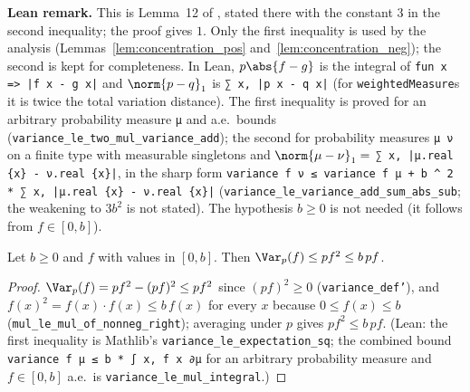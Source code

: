 \textbf{Lean remark.} This is Lemma~12 of \cite{menard2021fast}, stated there with the constant
$3$ in the second inequality; the proof gives $1$. Only the first inequality is used by the
analysis (Lemmas~\ref{lem:concentration_pos} and~\ref{lem:concentration_neg}); the second is
kept for completeness. In Lean, $p\abs{f - g}$ is the integral of \texttt{fun x => |f x - g x|}
and $\norm{p - q}_1$ is \texttt{∑ x, |p x - q x|} (for \texttt{weightedMeasure}s it is twice the
total variation distance). The first inequality is proved for an arbitrary probability measure
\texttt{μ} and a.e.\ bounds (\texttt{variance\_le\_two\_mul\_variance\_add}); the second for
probability measures \texttt{μ ν} on a finite type with measurable singletons and
$\norm{\mu - \nu}_1 = $ \texttt{∑ x, |μ.real \{x\} - ν.real \{x\}|}, in the sharp form
\texttt{variance f ν ≤ variance f μ + b \^{} 2 * ∑ x, |μ.real \{x\} - ν.real \{x\}|}
(\texttt{variance\_le\_variance\_add\_sum\_abs\_sub}; the weakening to $3b^2$ is not stated). The
hypothesis $b \ge 0$ is not needed (it follows from $f \in [0, b]$).

\begin{lemma}\label{lem:var_le_range_mean}
\leanok
Let $b \ge 0$ and $f$ with values in $[0, b]$. Then $\Var_p(f) \le pf^2 \le b\, pf$.
\end{lemma}

\begin{proof}
\leanok
$\Var_p(f) = pf^2 - (pf)^2 \le pf^2$ since $(pf)^2 \ge 0$ (\texttt{variance\_def'}), and
$f(x)^2 = f(x) \cdot f(x) \le b\, f(x)$ for every $x$ because $0 \le f(x) \le b$
(\texttt{mul\_le\_mul\_of\_nonneg\_right}); averaging under $p$ gives $pf^2 \le b\,pf$.
(Lean: the first inequality is Mathlib's \texttt{variance\_le\_expectation\_sq}; the combined
bound \texttt{variance f μ ≤ b * ∫ x, f x ∂μ} for an arbitrary probability measure and
$f \in [0, b]$ a.e.\ is \texttt{variance\_le\_mul\_integral}.)
\end{proof}
